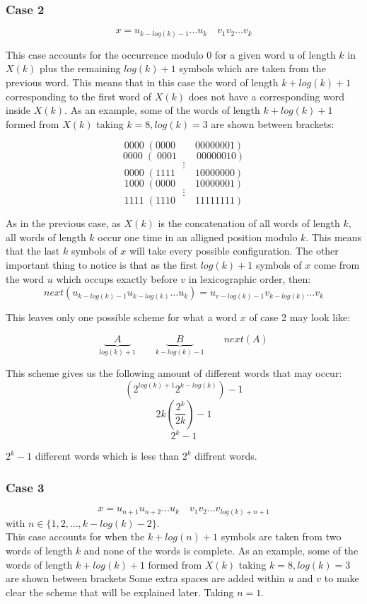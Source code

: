 \documentclass[10pt, a4paper]{article}
\theoremstyle{definition}
\begin{document}
\subsubsection{Case 2}
$$ x = u_{k-log(k)-1} \dots u_k \quad v_1 v_2 \dots v_k$$

This case accounts for the occurrence modulo 0 for a given word u of length $k$ in $X(k)$ plus the remaining $log(k) + 1$ symbols which are taken from the previous word. This means that in this case the word of length $k + log(k) + 1$ corresponding to the first word of $X(k)$ does not have a corresponding word inside $X(k)$.
As an example, some of the words of length $k + log(k) + 1$ formed from $X(k)$ taking $k = 8, log(k) = 3$ are shown between brackets:

$$0000 \; (0000 \qquad 00000001)$$
$$0000 \; ( \; 0001 \qquad 00000010)$$
$$\vdots$$
$$0000 \; (1111 \qquad 10000000)$$
$$1000 \; (0000 \qquad 10000001)$$
$$\vdots$$
$$1111 \; (1110 \qquad 11111111)$$

As in the previous case, as $X(k)$ is the concatenation of all words of length $k$, all words of length $k$ occur one time in an alligned position modulo $k$. This means that the last $k$ symbols of $x$ will take every possible configuration.
The other important thing to notice is that as the first $log(k) + 1$ symbols of $x$ come from the word $u$ which occups exactly before $v$ in lexicographic order, then: 
$$next(u_{k-log(k)-1} u_{k-log(k)} \dots u_k) = u_{v-log(k)-1} v_{k-log(k)} \dots v_k$$

This leaves only one possible scheme for what a word $x$ of case 2 may look like:

$$\underbrace{\quad A \quad }_{log(k) +1} \qquad \underbrace{\quad B \quad }_{k - log(k) - 1}  \qquad next(A)$$

This scheme gives us the following amount of different words that may occur:
$$(2^{log(k) + 1} 2^{k-log(k)})-1$$
$$ 2k  (\frac{2^k}{2k}) - 1$$
$$ 2^k - 1$$

$ 2^k - 1 $ different words which is less than $2^k$ diffrent words.

\subsubsection{Case 3}
$$x = u_{n+1} u_{n+2} \dots u_k \quad  v_1 v_2 \dots v_{log(k)+n+1} $$
with $n \in \{1,2,\dots ,k - log(k) - 2\}$.
\\

This case accounts for when the $k + log(n) + 1$ symbols are taken from two words of length $k$ and none of the words is complete.
As an example, some of the words of length $k + log(k) + 1$ formed from $X(k)$ taking $k = 8, log(k) = 3$ are shown between brackets
Some extra spaces are added within $u$ and $v$ to make clear the scheme that will be explained later.
Taking $n = 1$.
\end{document}
